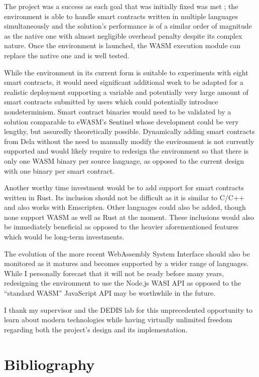 \documentclass[11pt, a4paper, twoside, openright]{article}
\begin{document}
The project was a success as each goal that was initially fixed was met ; the environment is able to handle smart contracts written in multiple languages simultaneously and the solution's performance is of a similar order of magnitude as the native one with almost negligible overhead penalty despite its complex nature. Once the environment is launched, the WASM execution module can replace the native one and is well tested.

While the environment in its current form is suitable to experiments with eight smart contracts, it would need significant additional work to be adapted for a realistic deployment supporting a variable and potentially very large amount of smart contracts submitted by users which could potentially introduce nondeterminism. Smart contract binaries would need to be validated by a solution comparable to eWASM's Sentinel whose development could be very lengthy, but assuredly theoretically possible. Dynamically adding smart contracts from Dela without the need to manually modify the environment is not currently supported and would likely require to redesign the environment so that there is only one WASM binary per source language, as opposed to the current design with one binary per smart contract.

Another worthy time investment would be to add support for smart contracts written in Rust. Its inclusion should not be difficult as it is similar to C/C++ and also works with Emscripten. Other languages could also be added, though none support WASM as well as Rust at the moment. These inclusions would also be immediately beneficial as opposed to the heavier aforementioned features which would be long-term investments.

The evolution of the more recent WebAssembly System Interface should also be monitored as it matures and becomes supported by a wider range of languages. While I personally forecast that it will not be ready before many years, redesigning the environment to use the Node.js WASI API as opposed to the ``standard WASM'' JavaScript API may be worthwhile in the future.

I thank my supervisor and the DEDIS lab for this unprecedented opportunity to learn about modern technologies while having virtually unlimited freedom regarding both the project's design and its implementation.

\newpage
\section{Bibliography}


\end{document}
